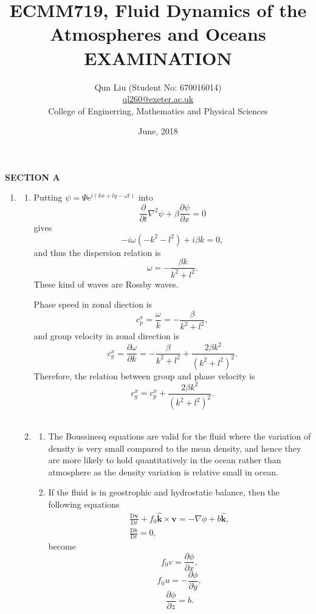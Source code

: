 \documentclass[a4paper]{article}
\title{ECMM719, Fluid Dynamics of the Atmospheres and Oceans\\
\textbf{EXAMINATION}}
\author{Qun Liu (Student No: 670016014)\\ \href{ql260@exeter.ac.uk}{ql260@exeter.ac.uk}
\\College of Enginerring, Mathematics and Physical Sciences}
\date{June, 2018}
\begin{document}
\maketitle

\textbf{SECTION A}

\begin{enumerate}[label=\textbf{\arabic*.}]
	\setcounter{enumi}{0}
	\item 
		\begin{enumerate}[label=\textbf{(\alph*)}]
			\setcounter{enumii}{0}
			\item Putting $\psi=\Psi\mathrm{e}^{i(kx+ly-\omega t)}$ into 
			$$\frac { \partial } { \partial t } \nabla ^ { 2} \psi + \beta \frac { \partial \psi } { \partial x } = 0$$
			gives
			$$ -i\omega(-k^2-l^2)+i\beta k=0,$$ 
			and thus the dispersion relation is
			$$ \omega=-\frac{\beta k}{k^2+l^2}.$$ 
			These kind of waves are Rossby waves.
			
			Phase speed in zonal diection is
			$$c^{x}_p=\frac{\omega}{k}=-\frac{\beta }{k^2+l^2},$$
			and group velocity in zonal direction is
			$$c^{x}_g=\frac{\partial \omega}{\partial k}=-\frac{\beta}{k^2+l^2}+\frac{2\beta k^2}{(k^2+l^2)^2}.$$
			Therefore, the relation between group and phase velocity is
			$$c _{ g }^{ x } = c _{ p }^{ x } + \frac{ 2\beta k ^ { 2} }{ \left( k ^ { 2} + l ^ { 2} \right)^{2} }.$$\\
			\vspace{0.5cm}
			\item 
			\begin{enumerate}[label=(\roman*)]
				\item The Boussinesq equations are valid for the fluid where the variation of density is very small compared to the mean density, and hence they are more
				likely to hold quantitatively in the ocean rather than atmosphere as the density variation is relative small in ocean.
				
				\item 
				If the fluid is in geostrophic and hydrostatic balance, then the following equations
				\begin{equation*}
					\left.\begin{array} {c} { \frac {\mathrm{D} \bm v } {\mathrm{D} t } + f_ {0} \hat { \mathbf { k } } \times \bm v = - \nabla \phi + b \hat { \mathbf {k} } } ,\\ { \frac {\mathrm{D} b } {\mathrm{D} t } = 0}, \end{array} \right.
				\end{equation*}
				become
				$$f_0v = \frac{\partial \phi}{\partial x},$$
				$$f_0u = -\frac{\partial \phi}{\partial y},$$
				$$\frac{\partial \phi}{\partial z}=b.$$
				

\end{enumerate}
\end{enumerate}
\end{enumerate}
\end{document}
